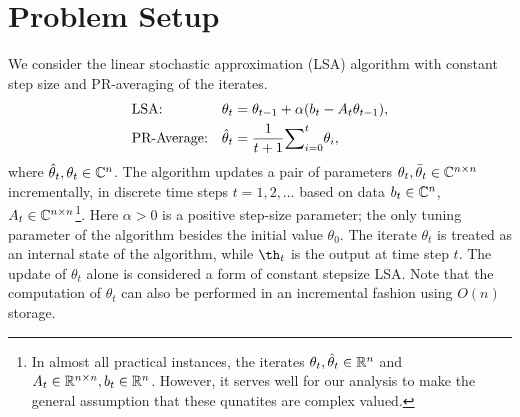 \documentclass{article}
\begin{document}
\section{Problem Setup}
We consider the linear stochastic approximation (LSA) algorithm with constant step size and PR-averaging of the iterates.
\begin{subequations}\label{eq:lsa}
\begin{align}
\label{conststep}&\text{LSA:} &\theta_t&=\theta_{t-1}+\alpha(b_t-A_t\theta_{t-1}),\\
\label{iteravg}&\text{PR-Average:} &\hat{\theta}_t&=\frac{1}{t+1}{\sum}_{i=0}^{t}\theta_i,
\end{align}
\end{subequations}
where $\hat{\theta}_t, \theta_t \in \mathbb{C}^{n}$. The algorithm updates a pair of parameters $\theta_t,\bar{\theta}_t\in \mathbb{C}^{n\times n}$ incrementally, in discrete time steps $t=1,2,\dots$
based on data $b_t\in \mathbb{C}^n$, $A_t\in \mathbb{C}^{n\times n}$\footnote{In almost all practical instances, the iterates $\theta_t,\hat{\theta}_t\in \mathbb{R}^n$ and $A_t\in \mathbb{R}^{n\times n}, b_t\in \mathbb{R}^n$. However, it serves well for our analysis to make the general assumption that these qunatites are complex valued.}. Here $\alpha>0$ is a positive step-size parameter; the only tuning parameter of the algorithm besides the
initial value $\theta_0$. The iterate $\theta_t$ is treated as an internal state of the algorithm, while $\th_t$ is the output at time step $t$. The update of $\theta_t$ alone is considered a form of constant stepsize LSA. Note that the computation of $\theta_t$ can also be performed in an incremental fashion using $O(n)$ storage.
\end{document}
